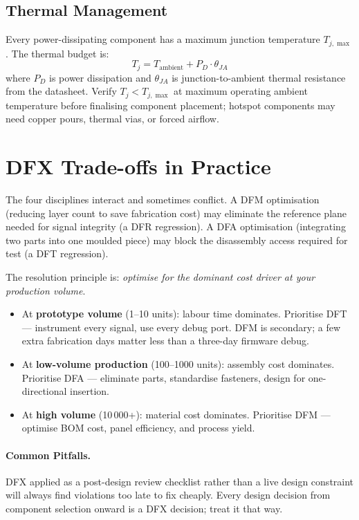 \subsection{Thermal Management}
\label{sec:ch7-dfr-thermal}

Every power-dissipating component has a maximum junction temperature $T_{j,\max}$.
The thermal budget is:
\[
  T_j = T_{\text{ambient}} + P_D \cdot \theta_{JA}
\]
where $P_D$ is power dissipation and $\theta_{JA}$ is junction-to-ambient
thermal resistance from the datasheet.
Verify $T_j < T_{j,\max}$ at maximum operating ambient temperature before
finalising component placement; hotspot components may need copper pours,
thermal vias, or forced airflow.

\section{DFX Trade-offs in Practice}
\label{sec:ch7-tradeoffs}

The four disciplines interact and sometimes conflict.
A DFM optimisation (reducing layer count to save fabrication cost) may eliminate
the reference plane needed for signal integrity (a DFR regression).
A DFA optimisation (integrating two parts into one moulded piece) may block the
disassembly access required for test (a DFT regression).

The resolution principle is: \emph{optimise for the dominant cost driver at your
production volume}.

\begin{itemize}
  \item At \textbf{prototype volume} (1--10 units): labour time dominates.
        Prioritise DFT --- instrument every signal, use every debug port.
        DFM is secondary; a few extra fabrication days matter less than a
        three-day firmware debug.
  \item At \textbf{low-volume production} (100--1000 units): assembly cost
        dominates.
        Prioritise DFA --- eliminate parts, standardise fasteners, design for
        one-directional insertion.
  \item At \textbf{high volume} (10\,000+): material cost dominates.
        Prioritise DFM --- optimise BOM cost, panel efficiency, and process yield.
\end{itemize}

\paragraph{Common Pitfalls.}
DFX applied as a post-design review checklist rather than a live design
constraint will always find violations too late to fix cheaply.
Every design decision from component selection onward is a DFX decision; treat
it that way.

